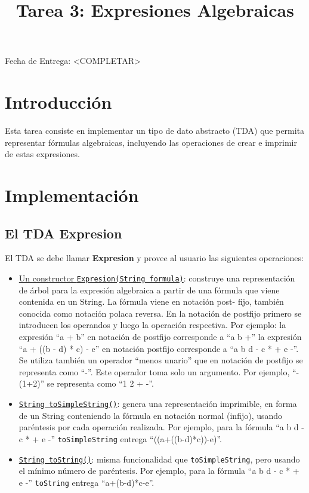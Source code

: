 \documentclass[dcc]{fcfmcourse}
\title{Tarea 3: Expresiones Algebraicas}
\begin{document}
\maketitle
\vspace{-2ex}
\begin{center}
Fecha de Entrega: <COMPLETAR>
\end{center}


\section{Introducción}
Esta tarea consiste en implementar un tipo de dato abstracto (TDA)
que permita representar fórmulas algebraicas, incluyendo las operaciones de
crear e imprimir  de estas expresiones. 


\section{Implementación}
\subsection{El TDA Expresion}
El TDA se debe llamar \textbf{Expresion} y provee al usuario las siguientes
operaciones:
\begin{itemize}
\item \underline{Un constructor \texttt{Expresion(String formula)}}: construye una representación
de árbol para la expresión algebraica a partir de una fórmula
que viene contenida en un String. La fórmula viene en notación post-
fijo, también conocida como notación polaca reversa. En la notación
de postfijo primero se introducen los operandos y luego la operación
respectiva. Por ejemplo: la expresión “a + b” en notación de postfijo
corresponde a “a b +” la expresión “a + ((b - d) * c) - e” en notación
postfijo corresponde a “a b d - c * + e -”. Se utiliza también un operador
“menos unario” que en notación de postfijo se representa como
“-”. Este operador toma solo un argumento. Por ejemplo, “-(1+2)” se
representa como “1 2 + -”.
\item \underline{\texttt{String toSimpleString()}}: genera una representación imprimible, en forma
de un String conteniendo la fórmula en notación normal (infijo), usando
paréntesis por cada operación realizada. Por ejemplo, para la fórmula “a b d - c * + e -” \texttt{toSimpleString}  entrega “((a+((b-d)*c))-e)”.
\item \underline{\texttt{String toString()}}: misma funcionalidad que \texttt{toSimpleString}, pero usando
el mínimo número de paréntesis. Por ejemplo, para la fórmula “a b d - c * + e -” \texttt{toString}  entrega “a+(b-d)*c-e”.

\end{itemize}
\end{document}
